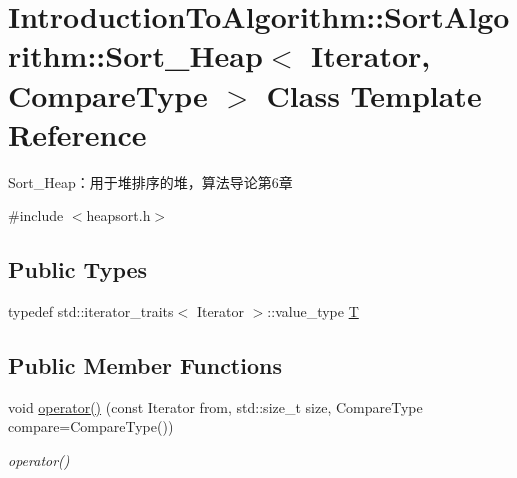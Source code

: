 \hypertarget{class_introduction_to_algorithm_1_1_sort_algorithm_1_1_sort___heap}{}\section{Introduction\+To\+Algorithm\+:\+:Sort\+Algorithm\+:\+:Sort\+\_\+\+Heap$<$ Iterator, Compare\+Type $>$ Class Template Reference}
\label{class_introduction_to_algorithm_1_1_sort_algorithm_1_1_sort___heap}


Sort\+\_\+\+Heap：用于堆排序的堆，算法导论第6章  




{\ttfamily \#include $<$heapsort.\+h$>$}

\subsection*{Public Types}
\begin{DoxyCompactItemize}
\item 
typedef std\+::iterator\+\_\+traits$<$ Iterator $>$\+::value\+\_\+type \hyperlink{class_introduction_to_algorithm_1_1_sort_algorithm_1_1_sort___heap_a5af910656f5d3c65d47f992dbf380c61}{T}
\end{DoxyCompactItemize}
\subsection*{Public Member Functions}
\begin{DoxyCompactItemize}
\item 
void \hyperlink{class_introduction_to_algorithm_1_1_sort_algorithm_1_1_sort___heap_adfaf638a6fd27c6295f7ac0a07484a00}{operator()} (const Iterator from, std\+::size\+\_\+t size, Compare\+Type compare=Compare\+Type())
\begin{DoxyCompactList}\small\item\em operator() \end{DoxyCompactList}\end{DoxyCompactItemize}
